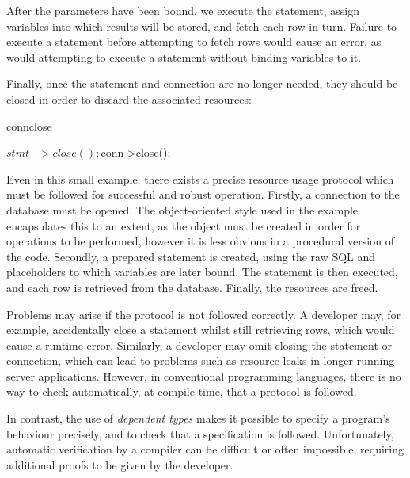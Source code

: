 \noindent
After the parameters have been bound, we execute the statement, assign
variables into which results will be stored, and fetch each row in turn. 
Failure to execute a statement before attempting to fetch rows would cause an error, as would attempting to execute a statement without binding variables to it.


\noindent
Finally, once the statement and connection are no longer needed, they should be
closed in order to discard the associated resources:

\begin{SaveVerbatim}{connclose}

  $stmt->close();
  $conn->close();

\end{SaveVerbatim}

\noindent
Even in this small example, there exists a precise resource usage protocol
which must be followed for successful and robust operation.
Firstly, a connection to the database must be opened. The object-oriented style
used in the example encapsulates this to an extent, as the object must be
created in order for operations to be performed, however it is less obvious in
a procedural version of the code. Secondly, a prepared statement is created,
using the raw SQL and placeholders to which variables are later bound. The
statement is then executed, and each row is retrieved from the database.
Finally, the resources are freed. 

Problems may arise if the protocol is not followed correctly.
A developer may, for example, accidentally close a statement whilst still
retrieving rows, which would cause a runtime error. Similarly, a developer may
omit closing the statement or connection, which can lead to
problems such as resource leaks in longer-running server applications.
However, in conventional programming languages, there is no way to check
automatically, at compile-time, that a protocol is followed.

In contrast, the use of \textit{dependent types} makes it possible
to specify a program's behaviour precisely, and to check that a 
specification is followed.
%
Unfortunately, automatic verification by a compiler can be difficult or
often impossible, requiring additional proofs to be given by the developer.

